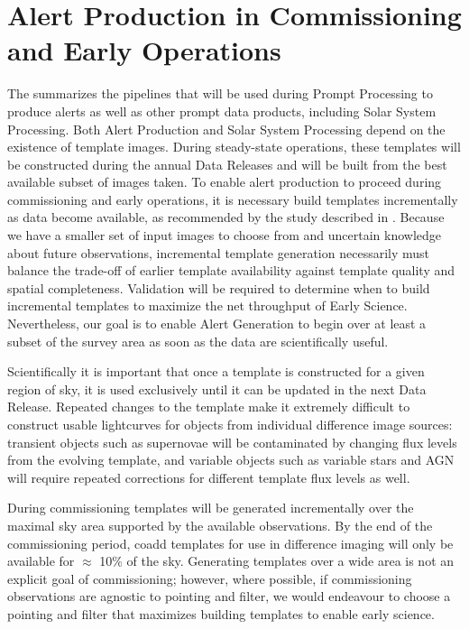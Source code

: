 


\section{Alert Production in Commissioning and Early Operations}
\label{sec:pp}

The \DPDD{} summarizes the pipelines that will be used during Prompt Processing to produce alerts as well as other prompt data products, including Solar System Processing.
Both Alert Production and Solar System Processing depend on the existence of template images.
During steady-state operations, these templates will be constructed during the annual Data Releases and will be built from the best available subset of images taken.
To enable alert production to proceed during commissioning and early operations, it is necessary build templates incrementally as data become available, as recommended by the study described in .
Because we have a smaller set of input images to choose from and uncertain knowledge about future observations, incremental template generation necessarily must balance the trade-off of earlier template availability against template quality and spatial completeness.
Validation will be required to determine when to build incremental templates to maximize the net throughput of Early Science.
Nevertheless, our goal is to enable Alert Generation to begin over at least a subset of the survey area as soon as the data are scientifically useful.

Scientifically it is important that once a template is constructed for a given region of sky, it is used exclusively until it can be updated in the next Data Release.
Repeated changes to the template make it extremely difficult to construct usable lightcurves for objects from individual difference image sources: transient objects such as supernovae will be contaminated by changing flux levels from the evolving template, and variable objects such as variable stars and AGN will require repeated corrections for different template flux levels as well.

During commissioning templates will be generated incrementally over the maximal sky area supported by the available observations.
By the end of the commissioning period, coadd templates for use in difference imaging will only be available for $\approx$ 10\% of the sky.
Generating templates over a wide area is not an explicit goal of commissioning;  however, where possible, if commissioning observations are agnostic to pointing and filter, we would endeavour to choose a pointing and filter that maximizes building templates to enable early science.

